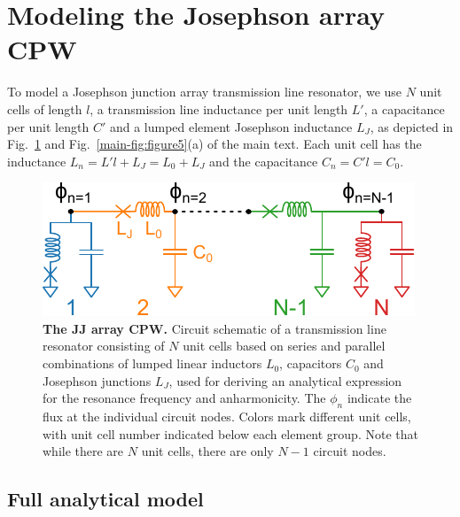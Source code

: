 \section{Modeling the Josephson array CPW}\label{sec:optimized}

To model a Josephson junction array transmission line resonator, we use $N$ unit cells of length $l$, a transmission line inductance per unit length $L'$, a capacitance per unit length $C'$ and a lumped element Josephson inductance $L_J$, as depicted in Fig.~\ref{fig:JJCPW-sketch} and Fig.~\ref{main-fig:figure5}(a) of the main text.
%
Each unit cell has the inductance $L_n = L'l + L_J=L_0+L_J$ and the capacitance $C_n = C'l = C_0$.

\begin{figure}[h]
	\centering
	\includegraphics[]{chapter-currentdetection/figures/SM_anharmonicity_circuit}
	\caption{
		\textbf{The JJ array CPW.}
		Circuit schematic of a transmission line resonator consisting of $N$ unit cells based on series and parallel combinations of lumped linear inductors $L_0$, capacitors $C_0$ and Josephson junctions $L_J$, used for deriving an analytical expression for the resonance frequency and anharmonicity.
		The $\phi_n$ indicate the flux at the individual circuit nodes.
		Colors mark different unit cells, with unit cell number indicated below each element group.
		Note that while there are $N$ unit cells, there are only $N-1$ circuit nodes.
	}
	\label{fig:JJCPW-sketch}
\end{figure}

\subsection{Full analytical model}\label{sec:analytical}

